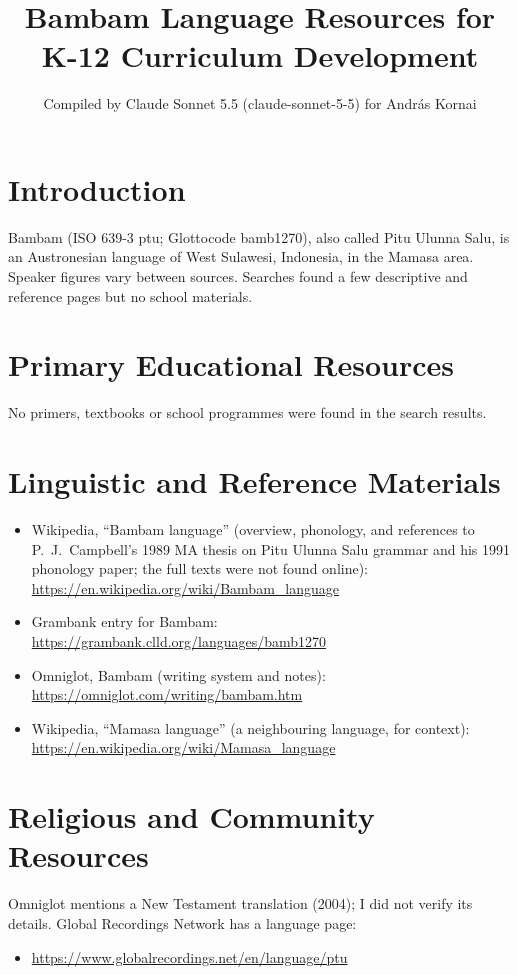 \documentclass[12pt]{article}
\title{Bambam Language Resources for K-12 Curriculum Development}
\author{Compiled by Claude Sonnet 5.5 (claude-sonnet-5-5) for Andr\'as Kornai}
\date{}
\begin{document}
\maketitle

\section{Introduction}
Bambam (ISO 639-3 ptu; Glottocode bamb1270), also called Pitu Ulunna Salu, is an Austronesian language of West Sulawesi, Indonesia, in the Mamasa area. Speaker figures vary between sources. Searches found a few descriptive and reference pages but no school materials.

\section{Primary Educational Resources}
No primers, textbooks or school programmes were found in the search results.

\section{Linguistic and Reference Materials}
\begin{itemize}
\item Wikipedia, ``Bambam language'' (overview, phonology, and references to P.\ J.\ Campbell's 1989 MA thesis on Pitu Ulunna Salu grammar and his 1991 phonology paper; the full texts were not found online): \url{https://en.wikipedia.org/wiki/Bambam_language}
\item Grambank entry for Bambam: \url{https://grambank.clld.org/languages/bamb1270}
\item Omniglot, Bambam (writing system and notes): \url{https://omniglot.com/writing/bambam.htm}
\item Wikipedia, ``Mamasa language'' (a neighbouring language, for context): \url{https://en.wikipedia.org/wiki/Mamasa_language}
\end{itemize}

\section{Religious and Community Resources}
Omniglot mentions a New Testament translation (2004); I did not verify its details. Global Recordings Network has a language page:
\begin{itemize}
\item \url{https://www.globalrecordings.net/en/language/ptu}
\end{itemize}
\end{document}
